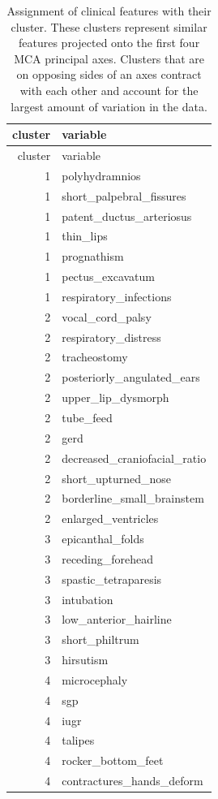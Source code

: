 \documentclass[
  authoryear,
  preprint,
  3p]{elsarticle}
\begin{document}
\hypertarget{tbl-profile}{}
\begin{longtable}[]{@{}rl@{}}
\caption{\label{tbl-profile}Assignment of clinical features with their
cluster. These clusters represent similar features projected onto the
first four MCA principal axes. Clusters that are on opposing sides of an
axes contract with each other and account for the largest amount of
variation in the data.}\tabularnewline
\toprule()
cluster & variable \\
\midrule()
\endfirsthead
\toprule()
cluster & variable \\
\midrule()
\endhead
1 & polyhydramnios \\
1 & short\_palpebral\_fissures \\
1 & patent\_ductus\_arteriosus \\
1 & thin\_lips \\
1 & prognathism \\
1 & pectus\_excavatum \\
1 & respiratory\_infections \\
2 & vocal\_cord\_palsy \\
2 & respiratory\_distress \\
2 & tracheostomy \\
2 & posteriorly\_angulated\_ears \\
2 & upper\_lip\_dysmorph \\
2 & tube\_feed \\
2 & gerd \\
2 & decreased\_craniofacial\_ratio \\
2 & short\_upturned\_nose \\
2 & borderline\_small\_brainstem \\
2 & enlarged\_ventricles \\
3 & epicanthal\_folds \\
3 & receding\_forehead \\
3 & spastic\_tetraparesis \\
3 & intubation \\
3 & low\_anterior\_hairline \\
3 & short\_philtrum \\
3 & hirsutism \\
4 & microcephaly \\
4 & sgp \\
4 & iugr \\
4 & talipes \\
4 & rocker\_bottom\_feet \\
4 & contractures\_hands\_deform \\

\end{longtable}
\end{document}

